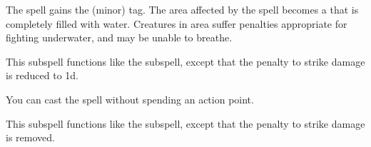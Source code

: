 
The spell gains the  (minor) tag.
The area affected by the spell becomes a  that is completely filled with water.
Creatures in area suffer penalties appropriate for fighting underwater, and may be unable to breathe.







This subspell functions like the  subspell, except that the penalty to strike damage is reduced to \minus1d.






You can cast the spell without spending an action point.






This subspell functions like the  subspell, except that the penalty to strike damage is removed.





